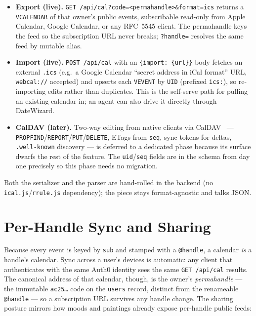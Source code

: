 \documentclass[10pt,letterpaper,twocolumn]{article}
\begin{document}
\begin{itemize}
  \item \textbf{Export (live).} \texttt{GET /api/cal?code=<permahandle>\&format=ics} returns a \texttt{VCALENDAR} of that owner's public events, subscribable read-only from Apple Calendar, Google Calendar, or any RFC~5545 client. The permahandle keys the feed so the subscription URL never breaks; \texttt{?handle=} resolves the same feed by mutable alias.
  \item \textbf{Import (live).} \texttt{POST /api/cal} with an \texttt{\{import:\,\{url\}\}} body fetches an external \texttt{.ics} (e.g.\ a Google Calendar ``secret address in iCal format'' URL, \texttt{webcal://} accepted) and upserts each \texttt{VEVENT} by \texttt{UID} (prefixed \texttt{ics:}), so re-importing edits rather than duplicates. This is the self-serve path for pulling an existing calendar in; an agent can also drive it directly through DateWizard.
  \item \textbf{CalDAV (later).} Two-way editing from native clients via CalDAV~\citep{rfc4791} --- \texttt{PROPFIND}/\texttt{REPORT}/\texttt{PUT}/\texttt{DELETE}, ETags from \texttt{seq}, sync-tokens for deltas, \texttt{.well-known} discovery --- is deferred to a dedicated phase because its surface dwarfs the rest of the feature. The \texttt{uid}/\texttt{seq} fields are in the schema from day one precisely so this phase needs no migration.
\end{itemize}

Both the serializer and the parser are hand-rolled in the backend (no \texttt{ical.js}/\texttt{rrule.js} dependency); the piece stays format-agnostic and talks JSON.

\section{Per-Handle Sync and Sharing}

Because every event is keyed by \texttt{sub} and stamped with a \texttt{@handle}, a calendar \emph{is} a handle's calendar. Sync across a user's devices is automatic: any client that authenticates with the same Auth0 identity sees the same \texttt{GET /api/cal} results. The canonical address of that calendar, though, is the owner's \emph{permahandle} --- the immutable \texttt{ac25\dots} code on the \texttt{users} record, distinct from the renameable \texttt{@handle} --- so a subscription URL survives any handle change. The sharing posture mirrors how moods and paintings already expose per-handle public feeds:
\end{document}
